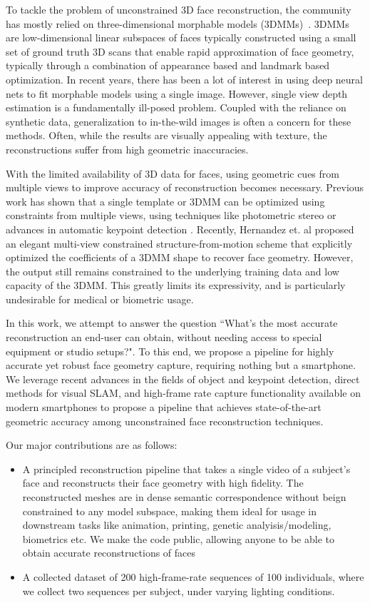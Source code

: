 \documentclass[10pt,twocolumn,letterpaper]{article}
\begin{document}
To tackle the problem of unconstrained 3D face reconstruction, the community has mostly relied on three-dimensional morphable models (3DMMs)~\cite{blanz1999morphable}. 3DMMs are low-dimensional linear subspaces of faces typically constructed using a small set of ground truth 3D scans that enable rapid approximation of face geometry, typically through a combination of appearance based and landmark based optimization. In recent years, there has been a lot of interest in using deep neural nets to fit morphable models using a single image. However, single view depth estimation is a fundamentally ill-posed problem. Coupled with the reliance on synthetic data, generalization to in-the-wild images is often a concern for these methods. Often, while the results are visually appealing with texture, the reconstructions suffer from high geometric inaccuracies.

With the limited availability of 3D data for faces, using geometric cues from multiple views to improve accuracy of reconstruction becomes necessary. Previous work has shown that a single template or 3DMM can be optimized using constraints from multiple views, using techniques like photometric stereo \cite{roth2015unconstrained} or advances in automatic keypoint detection \cite{huber2016multiresolution}.
Recently, Hernandez et. al \cite{hernandez2017accurate} proposed an elegant multi-view constrained structure-from-motion scheme that explicitly optimized the coefficients of a 3DMM shape to recover face geometry. However, the output still remains constrained to the underlying training data and low capacity of the 3DMM. This greatly limits its expressivity, and is particularly undesirable for medical or biometric usage. 


In this work, we attempt to answer the question ``What's the most accurate reconstruction an end-user can obtain, without needing access to special equipment or studio setups?". To this end, we propose a pipeline for highly accurate yet robust face geometry capture, requiring nothing but a smartphone. We leverage recent advances in the fields of object and keypoint detection, direct methods for visual SLAM, and high-frame rate capture functionality available on modern smartphones to propose a pipeline that achieves state-of-the-art geometric accuracy among unconstrained face reconstruction techniques.

Our major contributions are as follows:
 \begin{itemize}
     \item  A principled reconstruction pipeline that takes a single video of a subject's face and reconstructs their face geometry with high fidelity. The reconstructed meshes are in dense semantic correspondence without beign constrained to any model subspace, making them ideal for usage in downstream tasks like animation, printing, genetic analyisis/modeling, biometrics etc. We make the code public, allowing anyone to be able to obtain accurate reconstructions of faces
     \item A collected dataset of 200 high-frame-rate  sequences of 100 individuals, where we collect two sequences per subject, under varying lighting conditions.
 \end{itemize}
\end{document}
